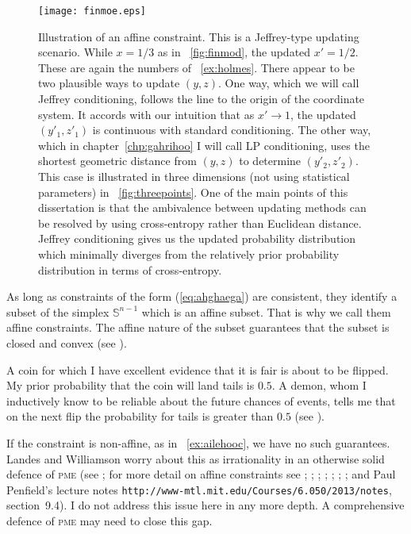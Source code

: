 \documentclass[phd,12pt,oneside]{ubcthesis}
\begin{document}
\begin{figure}[ht!]
    \begin{minipage}[h]{.7\linewidth}
      \texttt{[image: finmoe.eps]}
      \caption{\footnotesize Illustration of an affine constraint.
        This is a Jeffrey-type updating scenario. While $x=1/3$ as in
        {\igure}~\ref{fig:finmod}, the updated $x'=1/2$. These are
        again the numbers of {\xample}~\ref{ex:holmes}. There appear
        to be two plausible ways to update $(y,z)$. One way, which we
        will call Jeffrey conditioning, follows the line to the origin
        of the coordinate system. It accords with our intuition that
        as $x'\rightarrow{}1$, the updated $(y'_{1},z'_{1})$ is
        continuous with standard conditioning. The other way, which in
        chapter~\ref{chp:gahrihoo} I will call LP conditioning, uses
        the shortest geometric distance from $(y,z)$ to determine
        $(y'_{2},z'_{2})$. This case is illustrated in three
        dimensions (not using statistical parameters) in
        {\igure}~\ref{fig:threepoints}. One of the main points of this
        dissertation is that the ambivalence between updating methods
        can be resolved by using cross-entropy rather than Euclidean
        distance. Jeffrey conditioning gives us the updated
        probability distribution which minimally diverges from the
        relatively prior probability distribution in terms of
        cross-entropy.}
      \label{fig:finmoe}
    \end{minipage}
\end{figure}

As long as constraints of the form (\ref{eq:ahghaega}) are consistent,
they identify a subset of the simplex $\mathbb{S}^{n-1}$ which is an
affine subset. That is why we call them affine constraints. The affine
nature of the subset guarantees that the subset is closed and convex
(see ). 

\begin{quotex}
  \label{ex:ailehooc} A coin for which I
  have excellent evidence that it is fair is about to be flipped. My
  prior probability that the coin will land tails is $0.5$. A demon,
  whom I inductively know to be reliable about the future chances of
  events, tells me that on the next flip the probability for tails is
  greater than $0.5$ (see ). 
\end{quotex}

If the constraint is non-affine, as in {\xample}~\ref{ex:ailehooc}, we
have no such guarantees. Landes and Williamson worry about this as
irrationality in an otherwise solid defence of \textsc{pme} (see
; for more detail on affine constraints
see ; ;
; ;
; ;
; and Paul Penfield's lecture notes
\texttt{http://www-mtl.mit.edu/Courses/6.050/2013/notes},
section~9.4). I do not address this issue here in any more depth. A
comprehensive defence of \textsc{pme} may need to close this gap.
\end{document}
